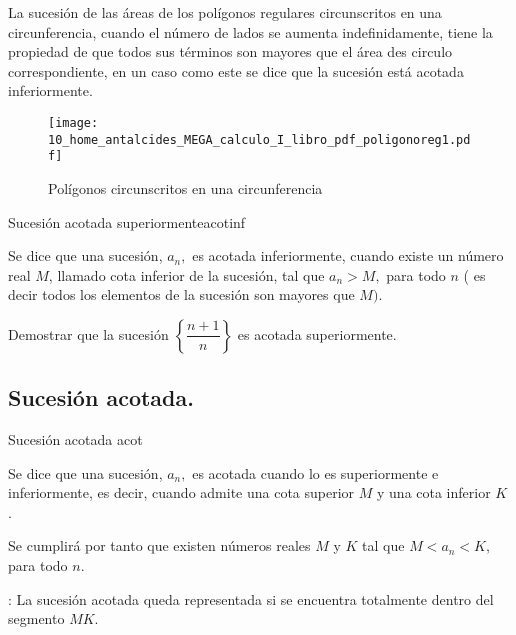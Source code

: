 \begin{ejemplo}

La sucesión de las áreas de los polígonos regulares circunscritos
en una circunferencia, cuando el número de lados se aumenta indefinidamente,
tiene la propiedad de que todos sus términos son mayores que el área
des circulo correspondiente, en un caso como este se dice que la sucesión
está acotada inferiormente. 

\begin{figure}[H]
\centering\texttt{[image: 10\_home\_antalcides\_MEGA\_calculo\_I\_libro\_pdf\_poligonoreg1.pdf]}\caption{Polígonos circunscritos en una circunferencia}\label{fig:poligono2}
\end{figure}

\end{ejemplo}

\begin{defi}{Sucesión acotada superiormente}{acotinf}

Se dice que una sucesión, $a_{n},$ es acotada inferiormente, cuando
existe un número real $M$, llamado cota inferior de la sucesión,
tal que $a_{n}>M,$ para todo $n$ ( es decir todos los elementos
de la sucesión son mayores que $M).$ 

\end{defi}

\begin{ejercicio}

Demostrar que la sucesión $\left\{ \dfrac{n+1}{n}\right\} $ es acotada
superiormente.

\end{ejercicio}

\subsection{Sucesión acotada.}

\begin{defi}{Sucesión acotada }{acot}

Se dice que una sucesión, $a_{n},$ es acotada cuando lo es superiormente
e inferiormente, es decir, cuando admite una cota superior $M$ y
una cota inferior $K$ .

Se cumplirá por tanto que existen números reales $M$ y $K$ tal que
$M<a_{n}<K,$ para todo $n.$ 

\end{defi}

: La sucesión acotada queda representada si
se encuentra totalmente dentro del segmento $MK.$


